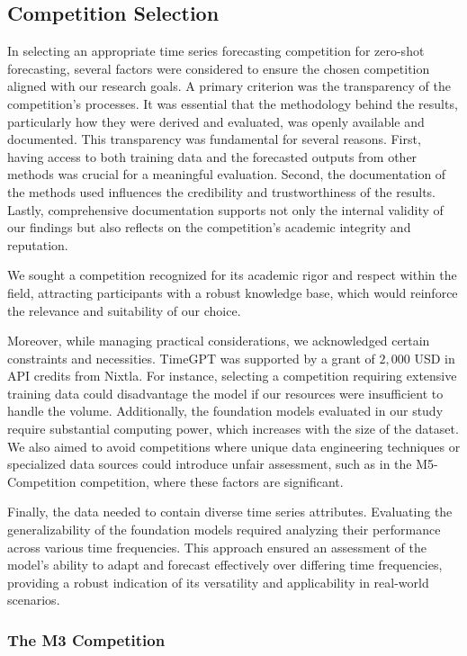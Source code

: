 \documentclass[12pt,a4paper]{article}
\begin{document}
\subsection{Competition Selection}


In selecting an appropriate time series forecasting competition for zero-shot forecasting, several factors were considered to ensure the chosen competition aligned with our research goals. A primary criterion was the transparency of the competition's processes. It was essential that the methodology behind the results, particularly how they were derived and evaluated, was openly available and documented. This transparency was fundamental for several reasons. First, having access to both training data and the forecasted outputs from other methods was crucial for a meaningful evaluation. Second, the documentation of the methods used influences the credibility and trustworthiness of the results. Lastly, comprehensive documentation supports not only the internal validity of our findings but also reflects on the competition's academic integrity and reputation. 

We sought a competition recognized for its academic rigor and respect within the field, attracting participants with a robust knowledge base, which would reinforce the relevance and suitability of our choice.

Moreover, while managing practical considerations, we acknowledged certain constraints and necessities. TimeGPT was supported by a grant of $2,000$ USD in API credits from Nixtla. For instance, selecting a competition requiring extensive training data could disadvantage the model if our resources were insufficient to handle the volume. Additionally, the foundation models evaluated in our study require substantial computing power, which increases with the size of the dataset. We also aimed to avoid competitions where unique data engineering techniques or specialized data sources could introduce unfair assessment, such as in the M5-Competition competition, where these factors are significant. 

Finally, the data needed to contain diverse time series attributes. Evaluating the generalizability of the foundation models required analyzing their performance across various time frequencies. This approach ensured an assessment of the model's ability to adapt and forecast effectively over differing time frequencies, providing a robust indication of its versatility and applicability in real-world scenarios.

\subsubsection{The M3 Competition}
\end{document}
